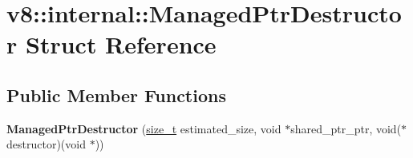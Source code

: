 \hypertarget{structv8_1_1internal_1_1ManagedPtrDestructor}{}\section{v8\+:\+:internal\+:\+:Managed\+Ptr\+Destructor Struct Reference}
\label{structv8_1_1internal_1_1ManagedPtrDestructor}
\subsection*{Public Member Functions}
\begin{DoxyCompactItemize}
\item 
\mbox{\label{structv8_1_1internal_1_1ManagedPtrDestructor_a4707114f17d39b9fbcb45297d6a3aac9}} 
{\bfseries Managed\+Ptr\+Destructor} (\mbox{\hyperlink{classsize__t}{size\+\_\+t}} estimated\+\_\+size, void $\ast$shared\+\_\+ptr\+\_\+ptr, void($\ast$destructor)(void $\ast$))
\end{DoxyCompactItemize}
